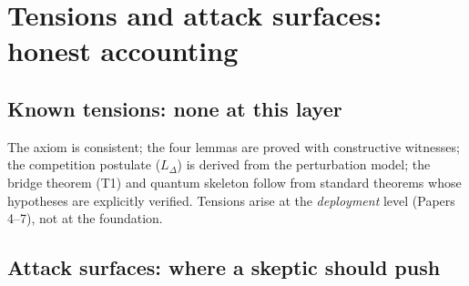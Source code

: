 \documentclass[11pt]{article}
\begin{document}
\section{Tensions and attack surfaces: honest accounting}

\subsection{Known tensions: none at this layer}

The axiom is consistent; the four lemmas are proved with constructive witnesses; the competition postulate ($L_\Delta$) is derived from the perturbation model; the bridge theorem (T1) and quantum skeleton follow from standard theorems whose hypotheses are explicitly verified.  Tensions arise at the \emph{deployment} level (Papers 4--7), not at the foundation.

\subsection{Attack surfaces: where a skeptic should push}
\end{document}
